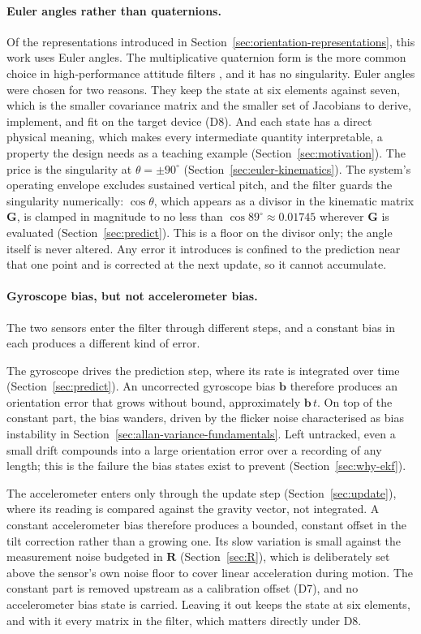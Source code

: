 \documentclass[12pt,a4paper]{article}
\newcommand{\bG}{\bm{G}}
\newcommand{\bR}{\bm{R}}
\begin{document}
{\paragraph{Euler angles rather than quaternions.} Of the
representations introduced in
Section~\ref{sec:orientation-representations}, this work uses Euler
angles. The multiplicative quaternion form is the more common choice
in high-performance attitude filters \citep{crassidis2007survey},
and it has no singularity. Euler angles were chosen for two reasons.
They keep the state at six elements against seven, which is the
smaller covariance matrix and the smaller set of Jacobians to derive,
implement, and fit on the target device (D8). And each state has a
direct physical meaning, which makes every intermediate quantity
interpretable, a property the design needs as a teaching example
(Section~\ref{sec:motivation}). The price is the singularity at
$\theta = \pm 90^{\circ}$ (Section~\ref{sec:euler-kinematics}). The
system's operating envelope excludes sustained vertical pitch, and
the filter guards the singularity numerically: $\cos\theta$, which
appears as a divisor in the kinematic matrix $\bG$, is clamped in
magnitude to no less than $\cos 89^{\circ} \approx 0.01745$ wherever
$\bG$ is evaluated (Section~\ref{sec:predict}). This is a floor on
the divisor only; the angle itself is never altered. Any error it
introduces is confined to the prediction near that one point and is
corrected at the next update, so it cannot accumulate. 

\paragraph{Gyroscope bias, but not accelerometer bias.}
\label{sec:accel-bias}
The two sensors enter the filter through different steps, and a
constant bias in each produces a different kind of error.

The gyroscope drives the prediction step, where its rate is
integrated over time (Section~\ref{sec:predict}). An uncorrected
gyroscope bias $\bm{b}$ therefore produces an orientation error that
grows without bound, approximately $\bm{b}\,t$. On top of the constant
part, the bias wanders, driven by the flicker noise characterised as
bias instability in Section~\ref{sec:allan-variance-fundamentals}.
Left untracked, even a small drift compounds into a large orientation
error over a recording of any length; this is the failure the bias
states exist to prevent (Section~\ref{sec:why-ekf}).

The accelerometer enters only through the update step
(Section~\ref{sec:update}), where its reading is compared against the
gravity vector, not integrated. A constant accelerometer bias
therefore produces a bounded, constant offset in the tilt correction
rather than a growing one. Its slow variation is small against the
measurement noise budgeted in $\bR$ (Section~\ref{sec:R}), which is
deliberately set above the sensor's own noise floor to cover linear
acceleration during motion. The constant part is removed upstream as
a calibration offset (D7), and no accelerometer bias state is
carried. Leaving it out keeps the state at six elements, and with it
every matrix in the filter, which matters directly under D8.

}
\end{document}
